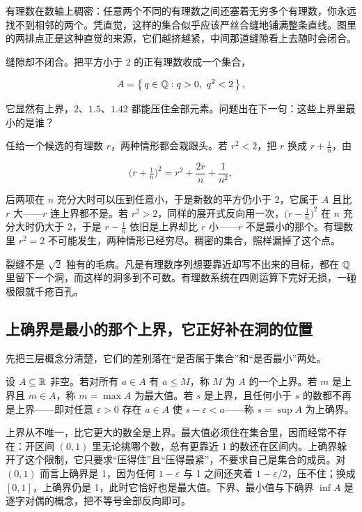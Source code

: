 有理数在数轴上稠密：任意两个不同的有理数之间还塞着无穷多个有理数，你永远找不到相邻的两个。凭直觉，这样的集合似乎应该严丝合缝地铺满整条直线。图里的两排点正是这种直觉的来源，它们越挤越紧，中间那道缝隙看上去随时会闭合。

缝隙却不闭合。把平方小于 2 的正有理数收成一个集合，

\[
A=\set{\,q\in\Q:q>0,\ q^2<2\,},
\]

它显然有上界，\(2\)、\(1.5\)、\(1.42\) 都能压住全部元素。问题出在下一句：这些上界里最小的是谁？

任给一个候选的有理数 \(r\)，两种情形都会栽跟头。若 \(r^2<2\)，把 \(r\) 换成 \(r+\frac1n\)，由

\[
\Big(r+\tfrac1n\Big)^2 = r^2 + \frac{2r}{n} + \frac1{n^2},
\]

后两项在 \(n\) 充分大时可以压到任意小，于是新数的平方仍小于 2，它属于 \(A\) 且比 \(r\) 大——\(r\) 连上界都不是。若 \(r^2>2\)，同样的展开式反向用一次，\(\big(r-\frac1n\big)^2\) 在 \(n\) 充分大时仍大于 2，于是 \(r-\frac1n\) 依旧是上界却比 \(r\) 小——\(r\) 不是最小的那个。有理数里 \(r^2=2\) 不可能发生，两种情形已经穷尽。稠密的集合，照样漏掉了这个点。

裂缝不是 \(\sqrt2\) 独有的毛病。凡是有理数序列想要靠近却写不出来的目标，都在 \(\mathbb{Q}\) 里留下一个洞，而这样的洞多到不可数。有理数系统在四则运算下完好无损，一碰极限就千疮百孔。

\subsection{上确界是最小的那个上界，它正好补在洞的位置}

先把三层概念分清楚，它们的差别落在``是否属于集合''和``是否最小''两处。

\begin{definition}
设 \(A\subseteq\mathbb{R}\) 非空。若对所有 \(a\in A\) 有 \(a\le M\)，称 \(M\) 为 \(A\) 的一个上界。若 \(m\) 是上界且 \(m\in A\)，称 \(m=\max A\) 为最大值。若 \(s\) 是上界，且任何小于 \(s\) 的数都不再是上界——即对任意 \(\varepsilon>0\) 存在 \(a\in A\) 使 \(s-\varepsilon<a\)——称 \(s=\sup A\) 为上确界。
\end{definition}

上界从不唯一，比它更大的数全是上界。最大值必须住在集合里，因而经常不存在：开区间 \((0,1)\) 里无论挑哪个数，总有更靠近 1 的数还在区间内。上确界躲开了这个限制，它只要求``压得住''且``压得最紧''，不要求自己是集合的成员。对 \((0,1)\) 而言上确界是 1，因为任何 \(1-\varepsilon\) 与 1 之间还夹着 \(1-\varepsilon/2\)，压不住；换成 \([0,1]\)，上确界仍是 1，此时它恰好也是最大值。下界、最小值与下确界 \(\inf A\) 是逐字对偶的概念，把不等号全部反向即可。

